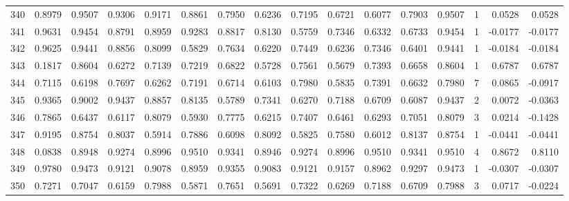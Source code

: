 \begin{tabular}{lrrrrrrrrrrrrrrr}
340 &      0.8979 &  0.9507 &  0.9306 &  0.9171 &  0.8861 &  0.7950 &  0.6236 &  0.7195 &  0.6721 &  0.6077 &   0.7903 &     0.9507 &      1 &                    0.0528 &                     0.0528 \\
341 &      0.9631 &  0.9454 &  0.8791 &  0.8959 &  0.9283 &  0.8817 &  0.8130 &  0.5759 &  0.7346 &  0.6332 &   0.6733 &     0.9454 &      1 &                   -0.0177 &                    -0.0177 \\
342 &      0.9625 &  0.9441 &  0.8856 &  0.8099 &  0.5829 &  0.7634 &  0.6220 &  0.7449 &  0.6236 &  0.7346 &   0.6401 &     0.9441 &      1 &                   -0.0184 &                    -0.0184 \\
343 &      0.1817 &  0.8604 &  0.6272 &  0.7139 &  0.7219 &  0.6822 &  0.5728 &  0.7561 &  0.5679 &  0.7393 &   0.6658 &     0.8604 &      1 &                    0.6787 &                     0.6787 \\
344 &      0.7115 &  0.6198 &  0.7697 &  0.6262 &  0.7191 &  0.6714 &  0.6103 &  0.7980 &  0.5835 &  0.7391 &   0.6632 &     0.7980 &      7 &                    0.0865 &                    -0.0917 \\
345 &      0.9365 &  0.9002 &  0.9437 &  0.8857 &  0.8135 &  0.5789 &  0.7341 &  0.6270 &  0.7188 &  0.6709 &   0.6087 &     0.9437 &      2 &                    0.0072 &                    -0.0363 \\
346 &      0.7865 &  0.6437 &  0.6117 &  0.8079 &  0.5930 &  0.7775 &  0.6215 &  0.7407 &  0.6461 &  0.6293 &   0.7051 &     0.8079 &      3 &                    0.0214 &                    -0.1428 \\
347 &      0.9195 &  0.8754 &  0.8037 &  0.5914 &  0.7886 &  0.6098 &  0.8092 &  0.5825 &  0.7580 &  0.6012 &   0.8137 &     0.8754 &      1 &                   -0.0441 &                    -0.0441 \\
348 &      0.0838 &  0.8948 &  0.9274 &  0.8996 &  0.9510 &  0.9341 &  0.8946 &  0.9274 &  0.8996 &  0.9510 &   0.9341 &     0.9510 &      4 &                    0.8672 &                     0.8110 \\
349 &      0.9780 &  0.9473 &  0.9121 &  0.9078 &  0.8959 &  0.9355 &  0.9083 &  0.9121 &  0.9157 &  0.8962 &   0.9297 &     0.9473 &      1 &                   -0.0307 &                    -0.0307 \\
350 &      0.7271 &  0.7047 &  0.6159 &  0.7988 &  0.5871 &  0.7651 &  0.5691 &  0.7322 &  0.6269 &  0.7188 &   0.6709 &     0.7988 &      3 &                    0.0717 &                    -0.0224 \\

\end{tabular}
